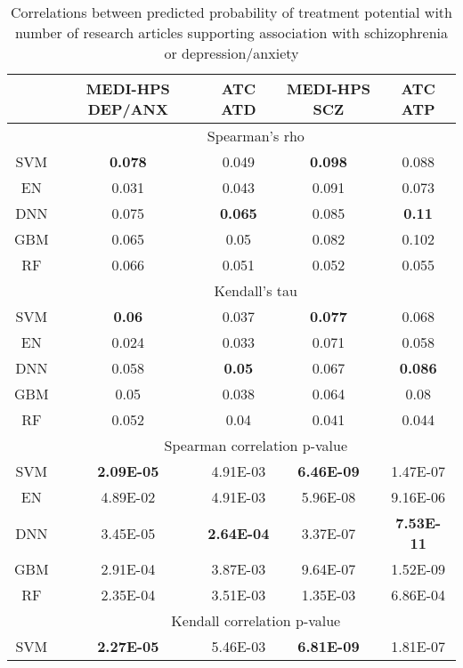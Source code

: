     \begin{table}[htbp]
      \centering
      \caption{Correlations between predicted probability of treatment potential with number of research articles supporting association with schizophrenia or depression/anxiety}
      \begin{threeparttable}
        \begin{tabular}{ccccc}
        \toprule
              & MEDI-HPS  DEP/ANX & ATC ATD & MEDI-HPS SCZ & ATC ATP \\
        \midrule
              & \multicolumn{4}{c}{Spearman's rho} \\
        SVM   & \textbf{0.078} & 0.049 & \textbf{0.098} & 0.088 \\
        EN    & 0.031 & 0.043 & 0.091 & 0.073 \\
        DNN   & 0.075 & \textbf{0.065} & 0.085 & \textbf{0.11} \\
        GBM   & 0.065 & 0.05  & 0.082 & 0.102 \\
        RF    & 0.066 & 0.051 & 0.052 & 0.055 \\
        \midrule
              & \multicolumn{4}{c}{Kendall's tau} \\
        SVM   & \textbf{0.06} & 0.037 & \textbf{0.077} & 0.068 \\
        EN    & 0.024 & 0.033 & 0.071 & 0.058 \\
        DNN   & 0.058 & \textbf{0.05} & 0.067 & \textbf{0.086} \\
        GBM   & 0.05  & 0.038 & 0.064 & 0.08 \\
        RF    & 0.052 & 0.04  & 0.041 & 0.044 \\
        \midrule
              & \multicolumn{4}{c}{Spearman correlation p-value} \\
        SVM   & \textbf{2.09E-05} & 4.91E-03 & \textbf{6.46E-09} & 1.47E-07 \\
        EN    & 4.89E-02 & 4.91E-03 & 5.96E-08 & 9.16E-06 \\
        DNN   & 3.45E-05 & \textbf{2.64E-04} & 3.37E-07 & \textbf{7.53E-11} \\
        GBM   & 2.91E-04 & 3.87E-03 & 9.64E-07 & 1.52E-09 \\
        RF    & 2.35E-04 & 3.51E-03 & 1.35E-03 & 6.86E-04 \\
        \midrule
              & \multicolumn{4}{c}{Kendall correlation p-value} \\
        SVM   & \textbf{2.27E-05} & 5.46E-03 & \textbf{6.81E-09} & 1.81E-07 \\

\end{tabular}
\end{threeparttable}
\end{table}
